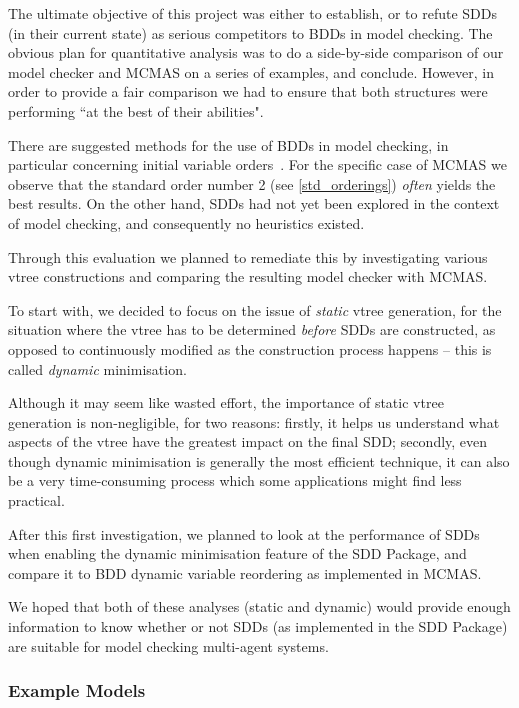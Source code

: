 \documentclass[11pt]{article}
\begin{document}
The ultimate objective of this project was either to establish, or to refute SDDs (in their current state) as serious competitors to BDDs in model checking. The obvious plan for quantitative analysis was to do a side-by-side comparison of our model checker and MCMAS on a series of examples, and conclude. However, in order to provide a fair comparison we had to ensure that both structures were performing ``at the best of their abilities". 

There are suggested methods for the use of BDDs in model checking, in particular concerning initial variable orders~\cite{bdd_heuristics}. For the specific case of MCMAS we observe that the standard order number 2 (see \ref{std_orderings}) \textit{often} yields the best results.
On the other hand, SDDs had not yet been explored in the context of model checking, and consequently no heuristics existed. 

Through this evaluation we planned to remediate this by investigating various vtree constructions and comparing the resulting model checker with MCMAS. 

To start with, we decided to focus on the issue of \textit{static} vtree generation, for the situation where the vtree has to be determined \textit{before} SDDs are constructed, as opposed to continuously modified as the construction process happens -- this is called \textit{dynamic} minimisation. 

Although it may seem like wasted effort, the importance of static vtree generation is non-negligible, for two reasons: firstly, it helps us understand what aspects of the vtree have the greatest impact on the final SDD; secondly, even though dynamic minimisation is generally the most efficient technique, it can also be a very time-consuming process which some applications might find less practical. 

After this first investigation, we planned to look at the performance of SDDs when enabling the dynamic minimisation feature of the SDD Package, and compare it to BDD dynamic variable reordering as implemented in MCMAS.

We hoped that both of these analyses (static and dynamic) would provide enough information to know whether or not SDDs (as implemented in the SDD Package) are suitable for model checking multi-agent systems.

\subsubsection{Example Models}
\label{ispl_examples}
\end{document}
